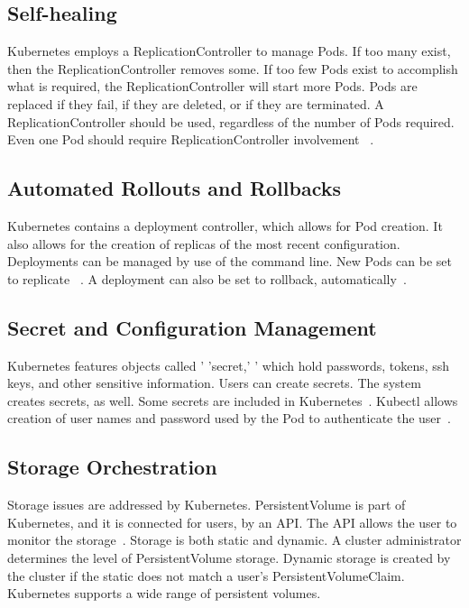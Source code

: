 \subsection{Self-healing}

Kubernetes employs a ReplicationController to manage Pods.  If too
many exist, then the ReplicationController removes some.  If too few
Pods exist to accomplish what is required, the ReplicationController
will start more Pods.  Pods are replaced if they fail, if they are
deleted, or if they are terminated.  A ReplicationController should be
used, regardless of the number of Pods required.  Even one Pod should
require ReplicationController involvement ~\cite{concept}.


\subsection{Automated Rollouts and Rollbacks}

Kubernetes contains a deployment controller, which allows for Pod
creation.  It also allows for the creation of replicas of the most
recent configuration.  Deployments can be managed by use of the
command line.  New Pods can be set to replicate ~\cite{concept}. A
deployment can also be set to rollback, automatically~\cite{concept}.  

\subsection{Secret and Configuration Management}

Kubernetes features objects called ' 'secret,' ' which hold passwords,
tokens, ssh keys, and other sensitive information.  Users can create
secrets.  The system creates secrets, as well.  Some secrets are
included in Kubernetes~\cite{concept}.  Kubectl allows creation of
user names and password used by the Pod to authenticate the  
user~\cite{concept}.  

\subsection{Storage Orchestration}

Storage issues are addressed by Kubernetes.  PersistentVolume is part
of Kubernetes, and it is connected for users, by an API.  The API
allows the user to monitor the storage~\cite{concept}.  Storage is
both static and dynamic.  A cluster administrator determines the level
of PersistentVolume storage.  Dynamic storage is created by the
cluster if the static does not match a user's PersistentVolumeClaim.
Kubernetes supports a wide range of persistent volumes.    


